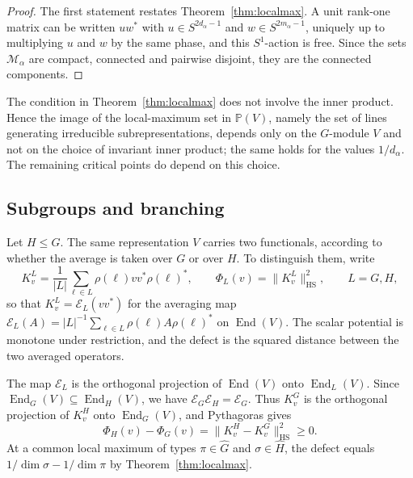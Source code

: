 \documentclass{amsart}
\theoremstyle{remark}
\DeclareMathOperator{\End}{End}
\newcommand{\norm}[1]{\lVert #1\rVert}
\begin{document}
\begin{proof}
The first statement restates Theorem~\ref{thm:localmax}. A unit rank-one matrix can be written $uw^*$ with
$u\in S^{2d_\alpha-1}$ and $w\in S^{2m_\alpha-1}$, uniquely up to multiplying $u$ and $w$ by the
same phase, and this $S^1$-action is free. Since the sets $\mathcal M_\alpha$ are compact,
connected and pairwise disjoint, they are the connected components.
\end{proof}
 
The condition in Theorem~\ref{thm:localmax} does not involve the inner product. Hence the image of
the local-maximum set in $\mathbb P(V)$, namely the set of lines generating irreducible subrepresentations,
depends only on the $G$-module $V$ and not on the choice of invariant inner product; the same holds
for the values $1/d_\alpha$. The remaining critical points do depend on this choice.
 
\subsection{Subgroups and branching}\label{subsec:branching}
 
Let $H\le G$. The same representation $V$ carries two functionals, according to whether the average is
taken over $G$ or over $H$. To distinguish them, write
\[
 K_v^L=\frac1{|L|}\sum_{\ell\in L}\rho(\ell)vv^*\rho(\ell)^*,
 \qquad
 \Phi_L(v)=\norm{K_v^L}_{\mathrm{HS}}^2,
 \qquad L=G,H,
\]
so that $K_v^L=\mathcal E_L(vv^*)$ for the averaging map
$\mathcal E_L(A)=|L|^{-1}\sum_{\ell\in L}\rho(\ell)A\rho(\ell)^*$ on $\End(V)$.
The scalar potential is monotone under restriction, and the defect is the squared distance between the
two averaged operators.
 
The map $\mathcal E_L$ is the orthogonal projection of $\End(V)$ onto $\End_L(V)$. Since
$\End_G(V)\subseteq\End_H(V)$, we have $\mathcal E_G\mathcal E_H=\mathcal E_G$. Thus $K_v^G$ is the orthogonal projection of $K_v^H$
onto $\End_G(V)$, and Pythagoras gives
\begin{equation}\label{eq:subgroup-refinement}
 \Phi_H(v)-\Phi_G(v)
 =\norm{K_v^H-K_v^G}_{\mathrm{HS}}^2\ge0.
\end{equation}
At a common local maximum of types $\pi\in\widehat G$ and $\sigma\in\widehat H$, the defect equals
$1/\dim\sigma-1/\dim\pi$ by Theorem~\ref{thm:localmax}.
 
\end{document}
